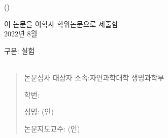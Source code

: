 
\begin{titlepage}
  \begin{spacing}{1.6}
    \makeatletter
    \begin{center}
      { \\}
      \vfill
      {\LARGE \@title\\}
      {\Large (\@titlealt)\\}

      \vfill

      {\Large
        이 논문을 이학사 학위논문으로 제출함 \\
        2022년 8월 \\
      }


      \vfill

      {\Large
        구분: 실험 \\
        \hfill\\
      }
    \end{center}
    \begin{quote}
      {\large
        논문심사 대상자 소속:\hfill 자연과학대학 생명과학부 \hfill \phantom{(인)} \par
        \phantom{논문심사 대상자} 학번: \hfill \@studentid \hfill \phantom{(인)} \par
        \phantom{논문심사 대상자} 성명: \hfill \@author \hfill (인) \par
        \par
        논문지도교수: \hfill \@advisor \hfill (인)
      }
    \end{quote}

    \vspace*{2cm}
    \makeatother
  \end{spacing}
\end{titlepage}

